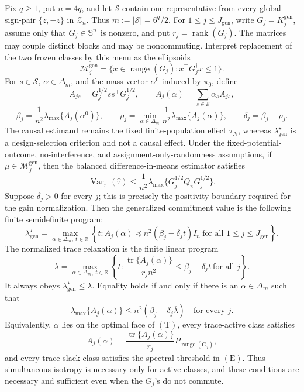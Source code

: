 Fix \(q\ge1\), put \(n=4q\), and let \(\mathscr S\) contain one representative from every global sign-pair \(\{z,-z\}\) in \(\mathcal Z_n\). Thus \(m:=|\mathscr S|=6^q/2\). For \(1\le j\le J_{\mathrm{gen}}\), write \(G_j=K_j^{\mathrm{gen}}\), assume only that \(G_j\in\mathbb S_+^n\) is nonzero, and put \(r_j=\operatorname{rank}(G_j)\). The matrices may couple distinct blocks and may be noncommuting. Interpret replacement of the two frozen classes by this menu as the ellipsoids
\[
\mathcal M_j^{\mathrm{gen}}
=\{x\in\operatorname{range}(G_j):x^\top G_j^\dagger x\le1\}.
\]
For \(s\in\mathscr S\), \(\alpha\in\Delta_m\), and the mass vector \(\alpha^0\) induced by \(\pi_0\), define
\[
A_{js}=G_j^{1/2}ss^\top G_j^{1/2},
\qquad
A_j(\alpha)=\sum_{s\in\mathscr S}\alpha_sA_{js},
\]
\[
\beta_j=\frac1{n^2}\lambda_{\max}\{A_j(\alpha^0)\},
\qquad
\rho_j=\min_{\alpha\in\Delta_m}\frac1{n^2}\lambda_{\max}\{A_j(\alpha)\},
\qquad
\delta_j=\beta_j-\rho_j.
\]
The causal estimand remains the fixed finite-population effect \(\tau_N\), whereas \(\lambda_{\mathrm{gen}}^\star\) is a design-selection criterion and not a causal effect. Under the fixed-potential-outcome, no-interference, and assignment-only-randomness assumptions, if \(\mu\in\mathcal M_j^{\mathrm{gen}}\), then the balanced difference-in-means estimator satisfies
\[
\operatorname{Var}_\pi(\widehat\tau)
\le \frac1{n^2}\lambda_{\max}
\{G_j^{1/2}Q_\pi G_j^{1/2}\}.
\]
Suppose \(\delta_j>0\) for every \(j\); this is precisely the positivity boundary required for the gain normalization. Then the generalized commitment value is the following finite semidefinite program:
\[
\boxed{
\lambda_{\mathrm{gen}}^\star
=\max_{\alpha\in\Delta_m,\ t\in\mathbb R}
\left\{t:
A_j(\alpha)\preceq n^2(\beta_j-\delta_jt)I_n
\ \text{for all }1\le j\le J_{\mathrm{gen}}
\right\}.}
\tag{P}
\]
The normalized trace relaxation is the finite linear program
\[
\overline\lambda
=\max_{\alpha\in\Delta_m,\ t\in\mathbb R}
\left\{t:
\frac{\operatorname{tr}\{A_j(\alpha)\}}{r_jn^2}
\le\beta_j-\delta_jt
\ \text{for all }j
\right\}.
\tag{T}
\]
It always obeys \(\lambda_{\mathrm{gen}}^\star\le\overline\lambda\). Equality holds if and only if there is an \(\alpha\in\Delta_m\) such that
\[
\lambda_{\max}\{A_j(\alpha)\}
\le n^2(\beta_j-\delta_j\overline\lambda)
\quad\text{for every }j.
\tag{E}
\]
Equivalently, \(\alpha\) lies on the optimal face of \((\mathrm T)\), every trace-active class satisfies
\[
A_j(\alpha)
=\frac{\operatorname{tr}\{A_j(\alpha)\}}{r_j}
P_{\operatorname{range}(G_j)},
\tag{I}
\]
and every trace-slack class satisfies the spectral threshold in \((\mathrm E)\). Thus simultaneous isotropy is necessary only for active classes, and these conditions are necessary and sufficient even when the \(G_j\)'s do not commute.

